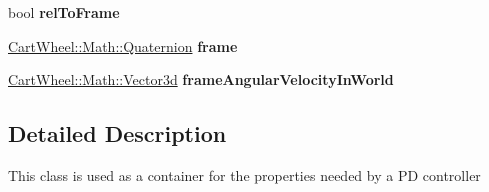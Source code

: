 \begin{DoxyCompactItemize}
\item 
\hypertarget{classCartWheel_1_1Core_1_1ControlParams_abf3323d2a154f0a69ab2cf41eb89778e}{
bool {\bfseries relToFrame}}
\label{classCartWheel_1_1Core_1_1ControlParams_abf3323d2a154f0a69ab2cf41eb89778e}

\item 
\hypertarget{classCartWheel_1_1Core_1_1ControlParams_a48c5760eefccb9d918863bb31407fbde}{
\hyperlink{classCartWheel_1_1Math_1_1Quaternion}{CartWheel::Math::Quaternion} {\bfseries frame}}
\label{classCartWheel_1_1Core_1_1ControlParams_a48c5760eefccb9d918863bb31407fbde}

\item 
\hypertarget{classCartWheel_1_1Core_1_1ControlParams_a0d0b0e18d48014e230b7d242bf7cff81}{
\hyperlink{classCartWheel_1_1Math_1_1Vector3d}{CartWheel::Math::Vector3d} {\bfseries frameAngularVelocityInWorld}}
\label{classCartWheel_1_1Core_1_1ControlParams_a0d0b0e18d48014e230b7d242bf7cff81}

\end{DoxyCompactItemize}


\subsection{Detailed Description}
This class is used as a container for the properties needed by a PD controller 

